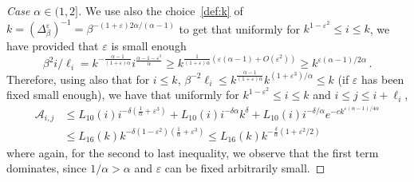 \documentclass[AHL,Unicode,longabstracts]{cedram}
\newenvironment{step}[1]{\begin{proof}[#1]}{\let\qed\relax\end{proof}}
\newcommand{\ga}{\alpha}
\newcommand{\gb}{\beta}
\newcommand{\gd}{\delta}
\newcommand{\gep}{\varepsilon}
\newcommand{\gD}{\Delta}
\newcommand{\cA}{\ensuremath{\mathcal{A}}}
\begin{document}
\begin{step}{{Case $\ga\in(1,2]$}}%
We use also the choice~\eqref{def:k} of $k=(\gD_{\gb}^{\gep})^{-1} = \gb^{-(1+\gep) 2\ga /(\ga-1)} $ to get that uniformly for $k^{1-\gep^2} \leq i\leq k$, we have provided that $\gep$ is small enough
\begin{equation}
\gb^2 i /\ell_i = k^{- \frac{\ga-1}{(1+\gep)\ga}} i^{\frac{\ga -1-\gep^3}{\ga}} \geq k^{ \frac{1}{(1+\gep) \ga} (\gep (\ga-1) +O(\gep^2))}\geq k^{\gep (\ga-1)/2\ga}\,.
\end{equation}
Therefore, using also that for $i\leq k$, $\gb^{-2} \ell_i \leq k^{\frac{\ga-1}{(1+\gep) \ga}} k^{(1+\gep^3)/\ga} \leq k$ (if $\gep$ has been fixed small enough), we have that uniformly for $k^{1-\gep^2} \leq i\leq k$ and $i\leq j\leq i+ \ell_i$,
\begin{equation}\label{boundA1}
\begin{split}
\cA_{i,j} &\leq L_{10}(i) i^{-\gd(\frac1\ga +\gep^3)} + L_{10}(i) i^{-\gd \ga} k^{\gd} + L_{10}(i) i^{-\gd/\ga} e^{-c k^{\gep (\ga-1)/4\ga }} \\
& \leq L_{16}(k) k^{-\gd(1-\gep^2)(\frac1\ga +\gep^3) } \leq L_{16}(k) k^{-\frac{\gd}{\ga} (1 + \gep^2 /2) }
\end{split}
\end{equation}
where again, for the second to last inequality, we observe that the first term dominates, since $1/\ga >\ga$ and $\gep$ can be fixed arbitrarily small.
\end{step}
\end{document}
